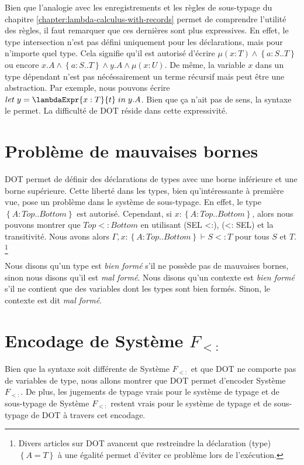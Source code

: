 Bien que l'analogie avec les enregistrements et les règles de sous-typage du
chapitre \ref{chapter:lambda-calculus-with-records} permet de comprendre
l'utilité des règles, il faut remarquer que ces dernières sont plus expressives. En
effet, le type intersection n'est pas défini uniquement pour les déclarations,
mais pour n'importe quel type. Cela signifie qu'il est autorisé d'écrire $\mu(x
: T) \wedge \left\{ a : S .. T \right\}$ ou encore $x.A \wedge \left\{ a : S ..
  T \right\} \wedge y.A \wedge \mu(x : U)$.
De même, la variable $x$ dans un type dépendant n'est pas nécéssairement un
terme récursif mais peut être une abstraction. Par exemple, nous pouvons écrire
$let \; y = \lambdaExpr{x : T}{t} \; in \; y.A$. Bien que ça n'ait pas de sens, la
syntaxe le permet.
La difficulté de DOT réside dans cette expressivité.

\section{Problème de mauvaises bornes}

DOT permet de définir des déclarations de types avec une borne inférieure et une
borne supérieure. Cette liberté dans les types, bien qu'intéressante à première
vue, pose un problème dans le système de sous-typage.
En effet, le type $\left\{ A : Top .. Bottom \right\}$ est autorisé. Cependant,
si $x : \left\{ A : Top .. Bottom \right\}$, alors nous pouvons montrer que
$Top <: Bottom$ en utilisant (SEL <:), (<: SEL) et la transitivité. Nous avons
alors $\Gamma, x : \left\{ A : Top .. Bottom \right\} \vdash S <: T$ pour tous
$S$ et $T$.
\footnote{Divers articles sur DOT \cite{OOPSLA-DOT-2016} avancent que restreindre la
déclaration (type) $\left\{ A = T \right\}$ à une égalité permet d'éviter ce
problème lors de l'exécution.}

Nous disons qu'un type est \textit{bien formé} s'il ne possède pas de mauvaises
bornes, sinon nous disons qu'il est \textit{mal formé}. Nous disons qu'un
contexte est \textit{bien formé} s'il ne contient que des variables dont les types
sont bien formés. Sinon, le contexte est dit \textit{mal formé}.

\section{Encodage de Système $F_{<:}$}

Bien que la syntaxe soit différente de Système $F_{<:}$ et que DOT ne comporte
pas de variables de type, nous allons montrer que DOT permet d'encoder Système
$F_{<:}$. De plus, les jugements de typage vrais pour le système de typage et de
sous-typage de Système $F_{<:}$ restent vrais pour le système de typage et de
sous-typage de DOT à travers cet encodage.

